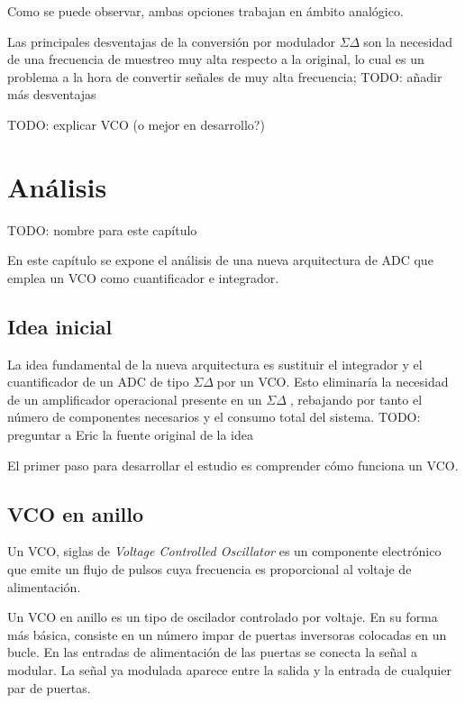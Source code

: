 \documentclass[12pt]{report} %
\newcommand{\sigmadelta}{$\Sigma\Delta\; $}
\begin{document}
	
	Como se puede observar, ambas opciones trabajan en ámbito analógico.
	
	Las principales desventajas de la conversión por modulador \sigmadelta son la necesidad de una frecuencia de muestreo muy alta respecto a la original, lo cual es un problema a la hora de convertir señales de muy alta frecuencia;
	TODO: añadir más desventajas
	
	TODO: explicar VCO (o mejor en desarrollo?)

	
\chapter{Análisis}
	
	TODO: nombre para este capítulo
	
	En este capítulo se expone el análisis de una nueva arquitectura de ADC que emplea un VCO como cuantificador e integrador.
	
	\section{Idea inicial}
	
	La idea fundamental de la nueva arquitectura es sustituir el integrador y el cuantificador de un ADC de tipo \sigmadelta por un VCO. Esto eliminaría la necesidad de un amplificador operacional presente en un \sigmadelta, rebajando por tanto el número de componentes necesarios y el consumo total del sistema.
	TODO: preguntar a Eric la fuente original de la idea
	
	El primer paso para desarrollar el estudio es comprender cómo funciona un VCO.
	
	\section{VCO en anillo}
	
	Un VCO, siglas de \textit{Voltage Controlled Oscillator} es un componente electrónico que emite un flujo de pulsos cuya frecuencia es proporcional al voltaje de alimentación.
	
	Un VCO en anillo es un tipo de oscilador controlado por voltaje. En su forma más básica, consiste en un número impar de puertas inversoras colocadas en un bucle. En las entradas de alimentación de las puertas se conecta la señal a modular. La señal ya modulada aparece entre la salida y la entrada de cualquier par de puertas.
	
\end{document}
